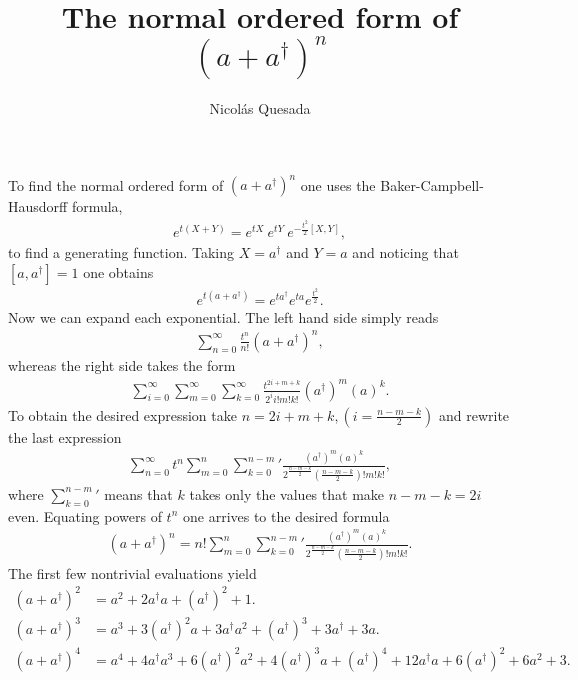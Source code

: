 \documentclass[english,12pt]{shreyasnotes}
\date{}
\title{The normal ordered form of $\left(a+a^{\dagger}\right)^n$}
\author{Nicol\'as Quesada}
\begin{document}
\maketitle
\thispagestyle{empty}

To find the normal ordered form of $(a+a^{\dagger})^n$ one uses the  Baker-Campbell-Hausdorff formula,
\begin{align}
e^{t(X+Y)}= e^{tX}~  e^{tY} ~e^{-\frac{t^2}{2} [X,Y]},
\end{align}
to find a generating function. Taking $X=a^{\dagger}$ and $Y=a$ and noticing that $[a,a^{\dagger}]=1$ one obtains
\begin{align}
e^{t(a+a^{\dagger})}=e^{ t a^{\dagger}} e^{t a} e^{\frac{t^2}{2}}.
\end{align}
Now we can expand each exponential. The left hand side simply reads
\begin{align}
\sum_{n=0}^{\infty}\frac{t^n}{n!}\left(a+a^{\dagger} \right)^n,
\end{align}
whereas the right side takes the form
\begin{align}
 \sum_{i=0}^{\infty} \sum_{m=0}^{\infty}  \sum_{k=0}^{\infty} \frac{t^{2i+m+k}}{2^i i! m! k!} (a^{\dagger})^m (a)^k.
\end{align}
To obtain the desired expression take $n=2i+m+k, (i=\frac{n-m-k}{2})$ and rewrite the last expression
\begin{align}
\sum_{n=0}^{\infty} t^n \sum_{m=0}^n  {\sum_{k=0}^{n-m}}{'} \frac{(a^{\dagger})^m (a)^k}{2^{\frac{n-m-k}{2}}\left(\frac{n-m-k}{2}\right)! m! k! },
\end{align}
where ${\sum_{k=0}^{n-m}}{'}$ means that $k$ takes only the values that make $n-m-k=2 i$ even. Equating
powers of $t^n$ one arrives to the desired formula
\begin{align}
\left(a+a^{\dagger} \right)^n = n! \sum_{m=0}^n  {\sum_{k=0}^{n-m}}{'} \frac{(a^{\dagger})^m (a)^k}{2^{\frac{n-m-k}{2}}\left(\frac{n-m-k}{2}\right)! m! k! }.
\end{align}
The first few nontrivial evaluations yield
\begin{subequations}
\begin{align}
\left(a+a^{\dagger} \right)^2 &=  a^2 +2 a^{\dagger}a+\left(a^{\dagger }\right)^2+1. \\
\left(a+a^{\dagger} \right)^3 &= a^3+3 \left(a^{\dagger
   }\right)^2 a +3 a^{\dagger}a^2+\left(a^{\dagger }\right)^3+3 a^{\dagger } +3 a .\\
\left(a+a^{\dagger} \right)^4 &= a^4+4 a^{\dagger }a^3+6 \left(a^{\dagger }\right)^2 a^2+4\left(a^{\dagger }\right)^3 a+\left(a^{\dagger }\right)^4+12 a^{\dagger}a+6\left(a^{\dagger }\right)^2+6 a^2+3.
\end{align}
\end{subequations}
\end{document}
